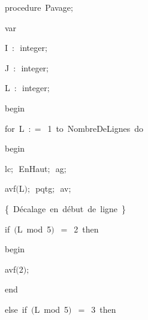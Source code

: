 {\pagebreak[3] 
\vspace{\neglskip}\mbox{\blc  \blk\idt  \mcl procedure\idt \ Pavage$;$}\par 
\pagebreak[3] 
\vspace{\neglskip}\mbox{\blc  \blk\blk\idt  \mcl var\idt \ }\par 
\vspace{\neglskip}\mbox{\blc  \blk\blk\blk\idt  I\ $:$\ integer$;$}\par 
\vspace{\neglskip}\mbox{\blc  \blk\blk\blk\idt  J\ $:$\ integer$;$}\par 
\vspace{\neglskip}\mbox{\blc  \blk\blk\blk\idt  L\ $:$\ integer$;$\ }\par 
\vspace{\neglskip}\mbox{\blc  \blk\idt  \mcl begin\idt }\par 
\pagebreak[3] 
\vspace{\neglskip}\mbox{\blc  \blk\blk\idt  \mcl for\idt \ L\ $:$$=$\ 1\ \mcl to\idt \ NombreDeLignes\ \mcl do\idt }\par 
\vspace{\neglskip}\mbox{\blc  \blk\blk\blk\idt  \mcl begin\idt }\par 
\vspace{\neglskip}\mbox{\blc  \blk\blk\blk\blk\idt  lc$;$\ EnHaut$;$\ ag$;$\ }\par 
\vspace{\neglskip}\mbox{\blc  \blk\blk\blk\blk\idt  avf$($L$)$$;$\ pqtg$;$\ av$;$}\par 
\vspace{\neglskip}\mbox{\blc  \blk\blk\blk\blk\idt  \cmt  \{\ Décalage\ en\ début\ de\ ligne\ \}\idt }\par 
\pagebreak[3] 
\vspace{\neglskip}\mbox{\blc  \blk\blk\blk\blk\idt  \mcl if\idt \ $($L\ \mcl mod\idt \ 5$)$\ $=$\ 2\ \mcl then\idt }\par 
\vspace{\neglskip}\mbox{\blc  \blk\blk\blk\blk\blk\idt  \mcl begin\idt }\par 
\vspace{\neglskip}\mbox{\blc  \blk\blk\blk\blk\blk\blk\idt  avf$($2$)$$;$}\par 
\vspace{\neglskip}\mbox{\blc  \blk\blk\blk\blk\blk\idt  \mcl end\idt }\par 
\pagebreak[3] 
\vspace{\neglskip}\mbox{\blc  \blk\blk\blk\blk\idt  \mcl else\idt \ \mcl if\idt \ $($L\ \mcl mod\idt \ 5$)$\ $=$\ 3\ \mcl then\idt }\par 
}
